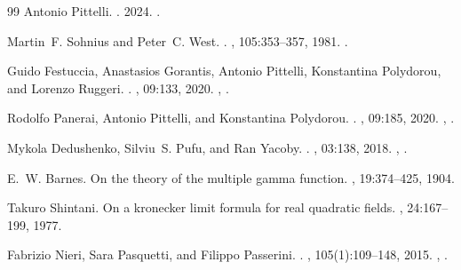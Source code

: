 \documentclass[11pt,a4paper]{article}
\numberwithin{equation}{section}
\theoremstyle{plain}
\theoremstyle{definition}
\theoremstyle{remark}
\begin{document}
\begin{thebibliography}{99}
Antonio Pittelli.
.
 2024.
\newblock \href {https://arxiv.org/abs/2403.12318} {}.

Martin~F. Sohnius and Peter~C. West.
.
, 105:353--357, 1981.
\newblock \href {https://doi.org/10.1016/0370-2693(81)90778-4}
  {}.

Guido Festuccia, Anastasios Gorantis, Antonio Pittelli, Konstantina Polydorou,
  and Lorenzo Ruggeri.
.
, 09:133, 2020.
\newblock \href {https://arxiv.org/abs/2005.12944} {},
  \href {https://doi.org/10.1007/JHEP09(2020)133}
  {}.

Rodolfo Panerai, Antonio Pittelli, and Konstantina Polydorou.
.
, 09:185, 2020.
\newblock \href {https://arxiv.org/abs/2006.06692} {},
  \href {https://doi.org/10.1007/JHEP09(2020)185}
  {}.

Mykola Dedushenko, Silviu~S. Pufu, and Ran Yacoby.
.
, 03:138, 2018.
\newblock \href {https://arxiv.org/abs/1610.00740} {},
  \href {https://doi.org/10.1007/JHEP03(2018)138}
  {}.

E.~W. Barnes.
\newblock On the theory of the multiple gamma function.
,
  19:374--425, 1904.

Takuro Shintani.
\newblock On a kronecker limit formula for real quadratic fields.
, 24:167--199, 1977.

Fabrizio Nieri, Sara Pasquetti, and Filippo Passerini.
.
, 105(1):109--148, 2015.
\newblock \href {https://arxiv.org/abs/1303.2626} {},
  \href {https://doi.org/10.1007/s11005-014-0727-9}
  {}.


\end{thebibliography}
\end{document}
